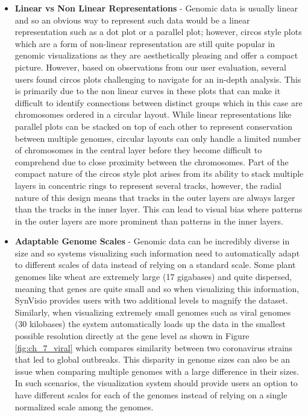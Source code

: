 \begin{itemize}
    \item \textbf{Linear vs Non Linear Representations} - Genomic data is usually linear and so an obvious way to represent such data would be a linear representation such as a dot plot or a parallel plot; however, circos style plots which are a form of non-linear representation are still quite popular in genomic visualizations as they are aesthetically pleasing and offer a compact picture. However, based on observations from our user evaluation, several users found circos plots challenging to navigate for an in-depth analysis. This is primarily due to the non linear curves in these plots that can make it difficult to identify connections between distinct groups which in this case are chromosomes ordered in a circular layout. While linear representations like parallel plots can be stacked on top of each other to represent conservation between multiple genomes, circular layouts can only handle a limited number of chromosomes in the central layer before they become difficult to comprehend due to close proximity between the chromosomes. Part of the compact nature of the circos style plot arises from its ability to stack multiple layers in concentric rings to represent several tracks, however, the radial nature of this design means that tracks in the outer layers are always larger than the tracks in the inner layer. This can lead to visual bias where patterns in the outer layers are more prominent than patterns in the inner layers.
    
    \item \textbf{Adaptable Genome Scales} - Genomic data can be incredibly diverse in size and so systems visualizing such information need to automatically adapt to different scales of data instead of relying on a standard scale. Some plant genomes like wheat are extremely large (17 gigabases) and quite dispersed, meaning that genes are quite small and so when visualizing this information, SynVisio provides users with two additional levels to magnify the dataset. Similarly, when visualizing extremely small genomes such as viral genomes (30 kilobases) the system automatically loads up the data in the smallest possible resolution directly at the gene level as shown in Figure \ref{fig:ch_7_viral} which compares similarity between two coronavirus strains that led to global outbreaks. This disparity in genome sizes can also be an issue when comparing multiple genomes with a large difference in their sizes. In such scenarios, the visualization system should provide users an option to have different scales for each of the genomes instead of relying on a single normalized scale among the genomes. 
\end{itemize}

